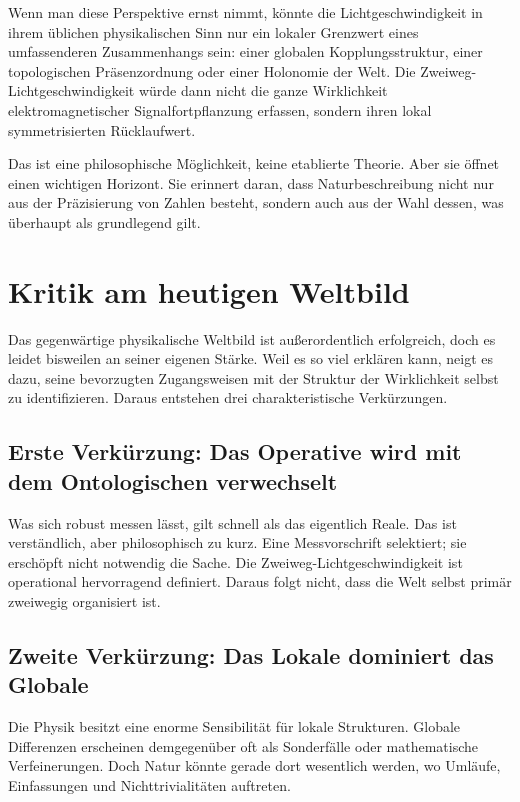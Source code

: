 \documentclass[11pt,a4paper]{article}
\theoremstyle{remark}
\begin{document}
	Wenn man diese Perspektive ernst nimmt, könnte die Lichtgeschwindigkeit in ihrem üblichen physikalischen Sinn nur ein lokaler Grenzwert eines umfassenderen Zusammenhangs sein: einer globalen Kopplungsstruktur, einer topologischen Präsenzordnung oder einer Holonomie der Welt. Die Zweiweg-Lichtgeschwindigkeit würde dann nicht die ganze Wirklichkeit elektromagnetischer Signalfortpflanzung erfassen, sondern ihren lokal symmetrisierten Rücklaufwert.
	
	Das ist eine philosophische Möglichkeit, keine etablierte Theorie. Aber sie öffnet einen wichtigen Horizont. Sie erinnert daran, dass Naturbeschreibung nicht nur aus der Präzisierung von Zahlen besteht, sondern auch aus der Wahl dessen, was überhaupt als grundlegend gilt.
	
	\section{Kritik am heutigen Weltbild}
	
	Das gegenwärtige physikalische Weltbild ist außerordentlich erfolgreich, doch es leidet bisweilen an seiner eigenen Stärke. Weil es so viel erklären kann, neigt es dazu, seine bevorzugten Zugangsweisen mit der Struktur der Wirklichkeit selbst zu identifizieren. Daraus entstehen drei charakteristische Verkürzungen.
	
	\subsection*{Erste Verkürzung: Das Operative wird mit dem Ontologischen verwechselt}
	
	Was sich robust messen lässt, gilt schnell als das eigentlich Reale. Das ist verständlich, aber philosophisch zu kurz. Eine Messvorschrift selektiert; sie erschöpft nicht notwendig die Sache. Die Zweiweg-Lichtgeschwindigkeit ist operational hervorragend definiert. Daraus folgt nicht, dass die Welt selbst primär zweiwegig organisiert ist.
	
	\subsection*{Zweite Verkürzung: Das Lokale dominiert das Globale}
	
	Die Physik besitzt eine enorme Sensibilität für lokale Strukturen. Globale Differenzen erscheinen demgegenüber oft als Sonderfälle oder mathematische Verfeinerungen. Doch Natur könnte gerade dort wesentlich werden, wo Umläufe, Einfassungen und Nichttrivialitäten auftreten.
	
\end{document}
